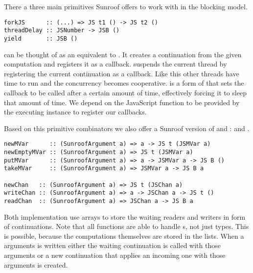 There a three main primitives Sunroof offers to work with in
the blocking model.
\begin{verbatim}
forkJS      :: (...) => JS t1 () -> JS t2 ()
threadDelay :: JSNumber -> JSB ()
yield       :: JSB ()
\end{verbatim}
 can be thought of as an equivalent to .
It creates a continuation from the given computation and registers 
it as a callback.  suspends the current thread by 
registering the current continuation as a callback. Like this 
other threads have time to run and the concurrency becomes 
cooperative.  is a form of  that sets 
the callback to be called after a certain amount of time,
effectively forcing it to sleep that amount of time.
We depend on the JavaScript function  to be provided
by the executing instance to register our callbacks. 

Based on this primitive combinators we also offer a Sunroof 
version of  and :  and .
\begin{verbatim}
newMVar      :: (SunroofArgument a) => a -> JS t (JSMVar a)
newEmptyMVar :: (SunroofArgument a) => JS t (JSMVar a)
putMVar      :: (SunroofArgument a) => a -> JSMVar a -> JS B ()
takeMVar     :: (SunroofArgument a) => JSMVar a -> JS B a

newChan   :: (SunroofArgument a) => JS t (JSChan a)
writeChan :: (SunroofArgument a) => a -> JSChan a -> JS t ()
readChan  :: (SunroofArgument a) => JSChan a -> JS B a
\end{verbatim}
Both implementation use arrays to store the waiting readers and
writers in form of continuations. Note that all functions
are able to handle s, not just 
types. This is possible, because the computations themselves are
stored in the lists. When a arguments is written either the waiting
continuation is called with those arguments or a new continuation 
that applies an incoming one with those arguments is created.

